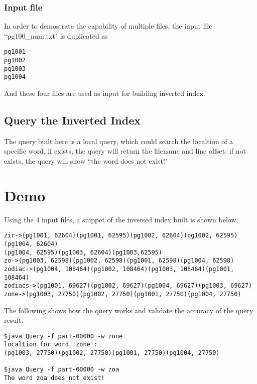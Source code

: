 \documentclass[12pt]{article}
\begin{document}
\subsubsection{Input file}
In order to demostrate the capability of multiple files, the input file ``pg100\_num.txt" is duplicated as 
\begin{verbatim}
pg1001
pg1002
pg1003
pg1004
\end{verbatim}
And these four files are used as input for building inverted index. 

\subsection{Query the Inverted Index}
The query built here is a local query, which could search the localtion of a specific word, if exists, the query will
return the filename and line offset; if not exists, the query will show ``the word does not exist!" 

\section{Demo}
Using the 4 input files, a snippet of the inversed index built is shown below:
\begin{verbatim}
zir->(pg1001, 62604)(pg1001, 62595)(pg1002, 62604)(pg1002, 62595)(pg1004, 62604)
(pg1004, 62595)(pg1003, 62604)(pg1003,62595)
zo->(pg1003, 62598)(pg1002, 62598)(pg1001, 62598)(pg1004, 62598)
zodiac->(pg1004, 108464)(pg1002, 108464)(pg1003, 108464)(pg1001, 108464)
zodiacs->(pg1001, 69627)(pg1002, 69627)(pg1004, 69627)(pg1003, 69627)
zone->(pg1003, 27750)(pg1002, 27750)(pg1001, 27750)(pg1004, 27750)
\end{verbatim}

The following shows how the query works and validate the accuracy of the query result.
\begin{verbatim}
$java Query -f part-00000 -w zone
localtion for word 'zone': 
(pg1003, 27750)(pg1002, 27750)(pg1001, 27750)(pg1004, 27750)

$java Query -f part-00000 -w zoa
The word zoa does not exist!
\end{verbatim}

\end{document}
